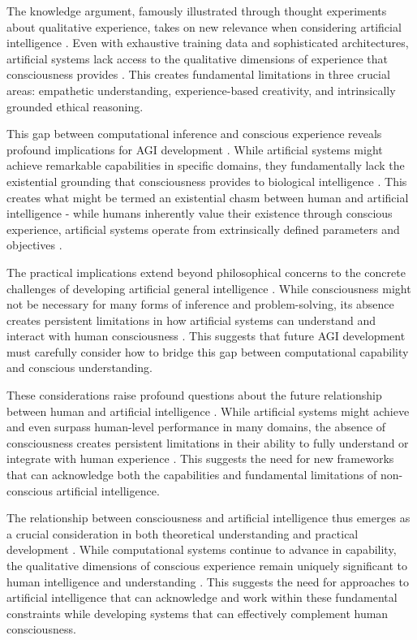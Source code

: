 The knowledge argument, famously illustrated through thought experiments about qualitative experience, takes on new relevance when considering artificial intelligence \cite{Searle2004}. Even with exhaustive training data and sophisticated architectures, artificial systems lack access to the qualitative dimensions of experience that consciousness provides \cite{Hoffman2019}. This creates fundamental limitations in three crucial areas: empathetic understanding, experience-based creativity, and intrinsically grounded ethical reasoning.

This gap between computational inference and conscious experience reveals profound implications for AGI development \cite{Bostrom2014}. While artificial systems might achieve remarkable capabilities in specific domains, they fundamentally lack the existential grounding that consciousness provides to biological intelligence \cite{Dennett2017}. This creates what might be termed an existential chasm between human and artificial intelligence - while humans inherently value their existence through conscious experience, artificial systems operate from extrinsically defined parameters and objectives \cite{Mitchell2019}.

The practical implications extend beyond philosophical concerns to the concrete challenges of developing artificial general intelligence \cite{Goertzel2007}. While consciousness might not be necessary for many forms of inference and problem-solving, its absence creates persistent limitations in how artificial systems can understand and interact with human consciousness \cite{Tegmark2017}. This suggests that future AGI development must carefully consider how to bridge this gap between computational capability and conscious understanding.

These considerations raise profound questions about the future relationship between human and artificial intelligence \cite{Zarkadakis2016}. While artificial systems might achieve and even surpass human-level performance in many domains, the absence of consciousness creates persistent limitations in their ability to fully understand or integrate with human experience \cite{Kurzweil2012}. This suggests the need for new frameworks that can acknowledge both the capabilities and fundamental limitations of non-conscious artificial intelligence.

The relationship between consciousness and artificial intelligence thus emerges as a crucial consideration in both theoretical understanding and practical development \cite{Tononi2015}. While computational systems continue to advance in capability, the qualitative dimensions of conscious experience remain uniquely significant to human intelligence and understanding \cite{Churchland2013}. This suggests the need for approaches to artificial intelligence that can acknowledge and work within these fundamental constraints while developing systems that can effectively complement human consciousness.

